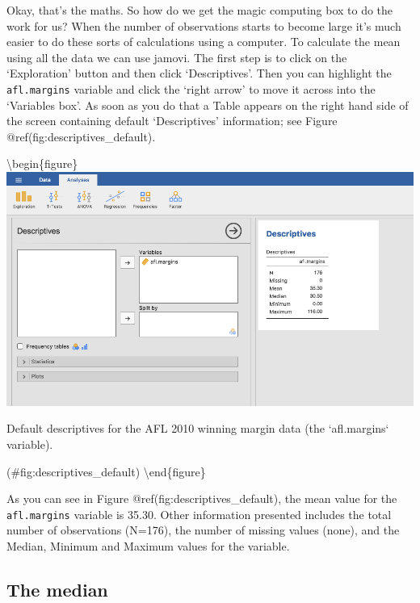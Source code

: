 \documentclass[
]{book}
\begin{document}
Okay, that's the maths. So how do we get the magic computing box to do the work for us? When the number of observations starts to become large it's much easier to do these sorts of calculations using a computer. To calculate the mean using all the data we can use jamovi. The first step is to click on the `Exploration' button and then click `Descriptives'. Then you can highlight the \texttt{afl.margins} variable and click the `right arrow' to move it across into the `Variables box'. As soon as you do that a Table appears on the right hand side of the screen containing default `Descriptives' information; see Figure @ref(fig:descriptives\_default).

\textbackslash begin\{figure\}
\includegraphics[width=13.82in]{img/descriptives/descriptives_default}

\caption{Default descriptives for the AFL 2010 winning margin data (the `afl.margins` variable).}

(\#fig:descriptives\_default)
\textbackslash end\{figure\}

As you can see in Figure @ref(fig:descriptives\_default), the mean value for the \texttt{afl.margins} variable is 35.30. Other information presented includes the total number of observations (N=176), the number of missing values (none), and the Median, Minimum and Maximum values for the variable.

\hypertarget{median}{%
\subsection{The median}\label{median}}
\end{document}
